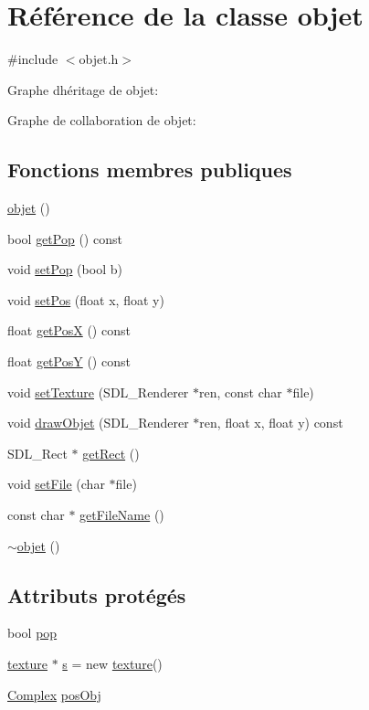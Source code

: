 \hypertarget{classobjet}{}\section{Référence de la classe objet}
\label{classobjet}


{\ttfamily \#include $<$objet.\+h$>$}



Graphe d\textquotesingle{}héritage de objet\+:


Graphe de collaboration de objet\+:
\subsection*{Fonctions membres publiques}
\begin{DoxyCompactItemize}
\item 
\hyperlink{classobjet_aeda20f498bea2b385904bee3a4151599}{objet} ()
\item 
bool \hyperlink{classobjet_a35cc4308dbe35d4897b2cdf93e5eeb58}{get\+Pop} () const
\item 
void \hyperlink{classobjet_aedb6bb9d4a7fb03ff4b60a47afa22793}{set\+Pop} (bool b)
\item 
void \hyperlink{classobjet_a62fef9f460ed7236684f6ddaaae4ce2c}{set\+Pos} (float x, float y)
\item 
float \hyperlink{classobjet_a14d6cb0ecc385f5a374aef05221169fc}{get\+PosX} () const
\item 
float \hyperlink{classobjet_a7a485e9e878a0ed1cd5b1b90f2cd89df}{get\+PosY} () const
\item 
void \hyperlink{classobjet_ac741f7e1b5d8bcb2174e698b801cdd24}{set\+Texture} (S\+D\+L\+\_\+\+Renderer $\ast$ren, const char $\ast$file)
\item 
void \hyperlink{classobjet_af98e6d209ad98f1f2e3620178e1cb616}{draw\+Objet} (S\+D\+L\+\_\+\+Renderer $\ast$ren, float x, float y) const
\item 
S\+D\+L\+\_\+\+Rect $\ast$ \hyperlink{classobjet_a0ea9eddbe8de1422f9d5100f1905f1b3}{get\+Rect} ()
\item 
void \hyperlink{classobjet_a570029d148bc7cff4293561ae91c2c11}{set\+File} (char $\ast$file)
\item 
const char $\ast$ \hyperlink{classobjet_aec4890842e14442a09a46a127cda95e3}{get\+File\+Name} ()
\item 
\hyperlink{classobjet_a33331c9b9a961c30266616f6080719e1}{$\sim$objet} ()
\end{DoxyCompactItemize}
\subsection*{Attributs protégés}
\begin{DoxyCompactItemize}
\item 
bool \hyperlink{classobjet_a0e1c8a51f415667f4b612b951bb401b8}{pop}
\item 
\hyperlink{classtexture}{texture} $\ast$ \hyperlink{classobjet_aeeaf84712cb013837845cac02ebe2b1e}{s} = new \hyperlink{classtexture}{texture}()
\item 
\hyperlink{classComplex}{Complex} \hyperlink{classobjet_a439fb5a8f7648ce62e31b9027c707742}{pos\+Obj}
\end{DoxyCompactItemize}


